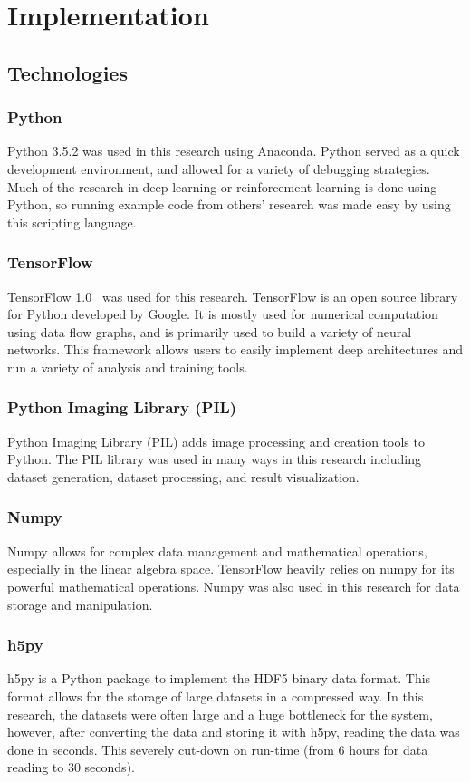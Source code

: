 \documentclass[12pt,american]{report}
\providecommand{\DIFaddend}{} %
\DeclareRobustCommand{\DIFaddend}{\DIFOaddend \let\includegraphics\DIFOincludegraphics} %
\begin{document}
\DIFaddend \chapter{Implementation}
\label{sec:implementation}
\section{Technologies}
\subsection{Python}
Python 3.5.2 was used in this research using Anaconda.  Python served as a quick development environment, and allowed for a variety of debugging strategies.  Much of the research in deep learning or reinforcement learning is done using Python, so running example code from others' research was made easy by using this scripting language.
\subsection{TensorFlow}
TensorFlow 1.0~\cite{tensorflow2015-whitepaper} was used for this research.  TensorFlow is an open source library for Python developed by Google.  It is mostly used for numerical computation using data flow graphs, and is primarily used to build a variety of neural networks.  This framework allows users to easily implement deep architectures and run a variety of analysis and training tools.  
\subsection{Python Imaging Library (PIL)}
Python Imaging Library (PIL) adds image processing and creation tools to Python. The PIL library was used in many ways in this research including dataset generation, dataset processing, and result visualization.
\subsection{Numpy}
Numpy allows for complex data management and mathematical operations, especially in the linear algebra space.  TensorFlow heavily relies on numpy for its powerful mathematical operations.  Numpy was also used in this research for data storage and manipulation. 
\subsection{h5py}
h5py is a Python package to implement the HDF5 binary data format.  This format allows for the storage of large datasets in a compressed way.  In this research, the datasets were often large and a huge bottleneck for the system, however, after converting the data and storing it with h5py, reading the data was done in seconds.  This severely cut-down on run-time (from 6 hours for data reading to 30 seconds). 
\end{document}
